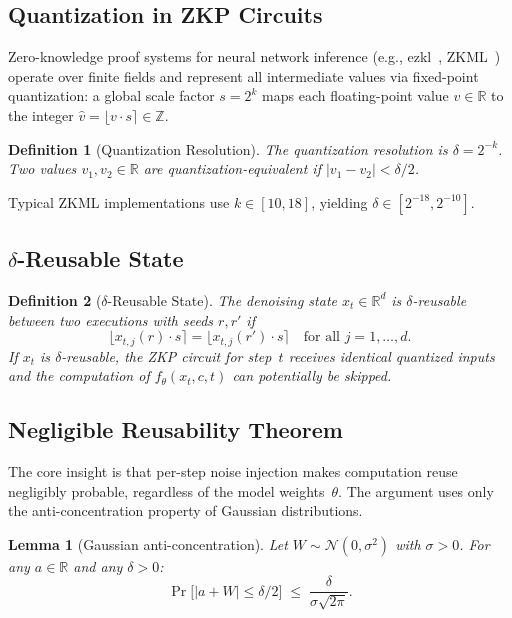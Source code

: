 \documentclass[11pt]{article}
\newtheorem{definition}{Definition}[section]
\newtheorem{lemma}{Lemma}[section]
\begin{document}
\subsection{Quantization in ZKP Circuits}
\label{subsec:quantization}

Zero-knowledge proof systems for neural network inference (e.g., ezkl~\cite{ezkl2024}, ZKML~\cite{chen2024zkml}) operate over finite fields and represent all intermediate values via fixed-point quantization: a global scale factor $s = 2^k$ maps each floating-point value $v \in \mathbb{R}$ to the integer $\hat{v} = \lfloor v \cdot s \rceil \in \mathbb{Z}$.

\begin{definition}[Quantization Resolution]
\label{def:quant-res}
The \emph{quantization resolution} is $\delta = 2^{-k}$. Two values $v_1, v_2 \in \mathbb{R}$ are \emph{quantization-equivalent} if $|v_1 - v_2| < \delta/2$.
\end{definition}

Typical ZKML implementations use $k \in [10, 18]$, yielding $\delta \in [2^{-18}, 2^{-10}]$.

\subsection{$\delta$-Reusable State}
\label{subsec:reusable}

\begin{definition}[$\delta$-Reusable State]
\label{def:reusable}
The denoising state $x_t \in \mathbb{R}^d$ is \emph{$\delta$-reusable} between two executions with seeds $r, r'$ if
\[
    \bigl\lfloor x_{t,j}(r) \cdot s \bigr\rceil = \bigl\lfloor x_{t,j}(r') \cdot s \bigr\rceil \quad \text{for all } j = 1, \ldots, d.
\]
If $x_t$ is $\delta$-reusable, the ZKP circuit for step~$t$ receives identical quantized inputs and the computation of $f_\theta(x_t, c, t)$ can potentially be skipped.
\end{definition}


\subsection{Negligible Reusability Theorem}
\label{subsec:main-theorem}

The core insight is that per-step noise injection makes computation reuse negligibly probable, regardless of the model weights~$\theta$. The argument uses only the anti-concentration property of Gaussian distributions.

\begin{lemma}[Gaussian anti-concentration]
\label{lem:anti-conc}
Let $W \sim \mathcal{N}(0, \sigma^2)$ with $\sigma > 0$. For any $a \in \mathbb{R}$ and any $\delta > 0$:
\[
    \Pr\!\bigl[|a + W| \leq \delta/2\bigr] \;\leq\; \frac{\delta}{\sigma\sqrt{2\pi}}.
\]
\end{lemma}
\end{document}
